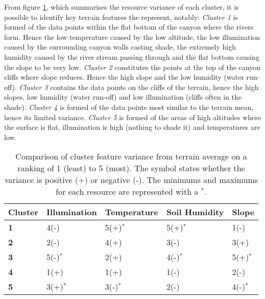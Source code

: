 From figure \ref{tab:clustering_test_cluster_variance}, which summarises the resource variance of each cluster, it is possible to identify key terrain features the represent, notably: \textit{Cluster 1} is formed of the data points within the flat bottom of the canyon where the rivers form. Hence the low temperature caused by the low altitude, the low illumination caused by the surrounding canyon walls casting shade, the extremely high humidity caused by the river stream passing through and the flat bottom causing the slope to be very low. \textit{Cluster 2} constitutes the points at the top of the canyon cliffs where slope reduces. Hence the high slope and the low humidity (water run-off). \textit{Cluster 3} contains the data points on the cliffs of the terrain, hence the high slopes, low humidity (water run-off) and low illumination (cliffs often in the shade). \textit{Cluster 4} is formed of the data points most similar to the terrain mean, hence its limited variance. \textit{Cluster 5} is formed of the areas of high altitudes where the surface is flat, illumination is high (nothing to shade it) and temperatures are low.\\

\begin{table}[]
  \centering
	    \begin{tabular}{|p{3cm}|p{3cm}|p{3cm}|p{3cm}|p{3cm}|}
		\hline	
  	    \textbf{Cluster} &  \textbf{Illumination} & \textbf{Temperature} & \textbf{Soil Humidity} & \textbf{Slope} \\
		\hline
		\textbf{1} & 4(-) & 5(+)$^{*}$ & 5(+)$^{*}$ & 1(-) \\
		\hline
		\textbf{2} & 2(-) & 4(+) & 3(-) & 3(+) \\
		\hline
		\textbf{3} & 5(-)$^{*}$ & 2(+) & 4(-)$^{*}$ & 5(+)$^{*}$ \\
		\hline
		\textbf{4} & 1(+) & 1(+) & 1(-) & 2(-) \\
		\hline
		\textbf{5} & 3(+)$^{*}$ & 3(-)$^{*}$ & 2(-) & 4(-)$^{*}$ \\
		\hline
		\end{tabular}
		\caption{Comparison of cluster feature variance from terrain average on a ranking of 1 (least) to 5 (most). The symbol states whether the variance is positive (+) or negative (-). The minimums and maximums for each resource are represented with a $^{*}$. }
	  \label{tab:clustering_test_cluster_variance}
\end{table}